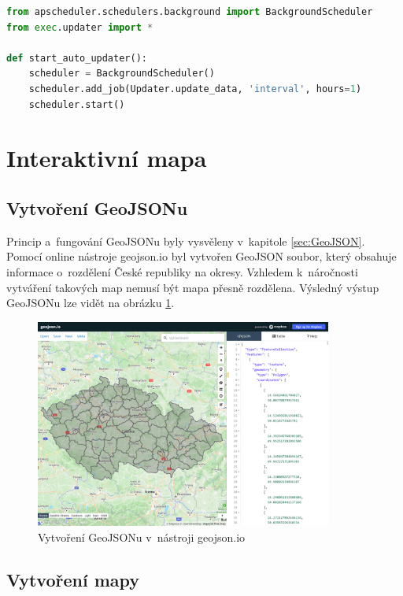 \begin{lstlisting}[language=Python,label=src:DjangoTask,caption={Nastavení plánované úlohy pomocí apscheduler}]
from apscheduler.schedulers.background import BackgroundScheduler
from exec.updater import *

def start_auto_updater():
    scheduler = BackgroundScheduler()
    scheduler.add_job(Updater.update_data, 'interval', hours=1)
    scheduler.start()
\end{lstlisting}

\section{Interaktivní mapa}

\subsection{Vytvoření GeoJSONu}

Princip a~fungování GeoJSONu byly vysvěleny v~kapitole \ref{sec:GeoJSON}. Pomocí online nástroje geojson.io \cite{geojson.io} byl vytvořen GeoJSON soubor, který obsahuje informace o~rozdělení České republiky na okresy. Vzhledem k~náročnosti vytváření takových map nemusí být mapa přesně rozdělena. Výsledný výstup GeoJSONu lze vidět na obrázku \ref{fig:GeoJSONczechia}.

\begin{figure}[h]
	\centering
	\includegraphics[width=0.87\textwidth]{Pictures/geojson_czech.png}
	\caption{Vytvoření GeoJSONu v~nástroji geojson.io \cite{geojson.io}}
	\label{fig:GeoJSONczechia}
\end{figure}

\subsection{Vytvoření mapy}
\label{map_creation}

